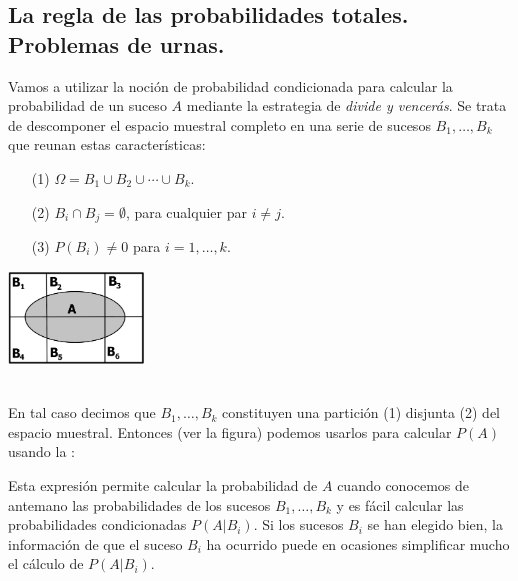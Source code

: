 \subsection{La regla de las probabilidades totales. Problemas de urnas.}
\label{cap03:subsec:ProbabilidadesTotales}

Vamos a utilizar la noción de probabilidad condicionada para calcular la probabilidad de un suceso $A$ mediante la estrategia de {\em divide y vencerás}.  Se trata de descomponer el espacio muestral completo en una serie de sucesos $B_1,\ldots,B_k$ que reunan estas características:\\[3mm]
\begin{minipage}{6.5cm}
    \begin{enumerate}
    	\item[(1)] $\Omega=B_1\cup B_2\cup\cdots\cup B_k.$
    	\item[(2)] $B_i\cap B_j=\emptyset$, para cualquier par $i\neq j$.
    	\item[(3)] $P(B_i)\neq 0$ para $i=1,\ldots,k$.
    \end{enumerate}
\end{minipage}
\begin{minipage}{6.5cm}
	\qquad\includegraphics[height=2.5cm]{../fig/Cap03-ProbabilidadesTotales.png}
\end{minipage}
\\[3mm]	
{En tal caso decimos que $B_1,\ldots,B_k$ constituyen una partici\'on (1) disjunta (2) del espacio muestral. } Entonces (ver la figura) podemos usarlos para calcular $P(A)$ usando la :
        \begin{center}
        \end{center}
Esta expresión permite calcular la probabilidad de $A$ cuando conocemos de antemano las probabilidades de los sucesos $B_1,\ldots,B_k$ y es fácil calcular las probabilidades condicionadas $P(A|B_i)$. Si los sucesos $B_i$ se han elegido bien, la información de que el suceso $B_i$ ha ocurrido puede en ocasiones simplificar mucho el cálculo de $P(A|B_i)$.

